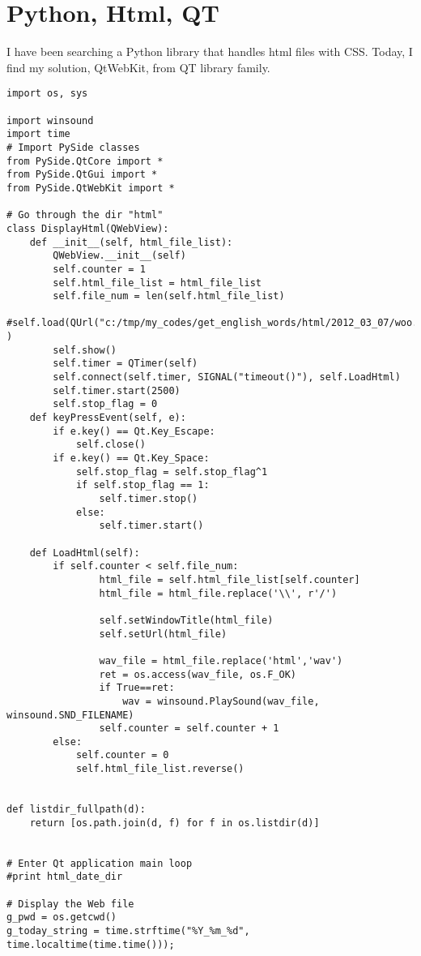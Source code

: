 \section{Python, Html, QT}
I have been searching a Python library that handles html files with CSS. Today, I find my solution, QtWebKit, from QT library family.
\begin{verbatim}
import os, sys

import winsound
import time
# Import PySide classes
from PySide.QtCore import *
from PySide.QtGui import *
from PySide.QtWebKit import *

# Go through the dir "html"
class DisplayHtml(QWebView):
    def __init__(self, html_file_list):
        QWebView.__init__(self)
        self.counter = 1
        self.html_file_list = html_file_list
        self.file_num = len(self.html_file_list)       
        #self.load(QUrl("c:/tmp/my_codes/get_english_words/html/2012_03_07/woo.html") )
        self.show()
        self.timer = QTimer(self)
        self.connect(self.timer, SIGNAL("timeout()"), self.LoadHtml)
        self.timer.start(2500)
        self.stop_flag = 0
    def keyPressEvent(self, e):
        if e.key() == Qt.Key_Escape:
            self.close()
        if e.key() == Qt.Key_Space:
            self.stop_flag = self.stop_flag^1 
            if self.stop_flag == 1:
                self.timer.stop()
            else:
                self.timer.start()

    def LoadHtml(self):
        if self.counter < self.file_num:
                html_file = self.html_file_list[self.counter]
                html_file = html_file.replace('\\', r'/')

                self.setWindowTitle(html_file)
                self.setUrl(html_file)

                wav_file = html_file.replace('html','wav')
                ret = os.access(wav_file, os.F_OK)
                if True==ret:
                    wav = winsound.PlaySound(wav_file, winsound.SND_FILENAME)
                self.counter = self.counter + 1
        else:
            self.counter = 0 
            self.html_file_list.reverse()


def listdir_fullpath(d):
    return [os.path.join(d, f) for f in os.listdir(d)]


# Enter Qt application main loop
#print html_date_dir

# Display the Web file
g_pwd = os.getcwd()
g_today_string = time.strftime("%Y_%m_%d", time.localtime(time.time())); 
        

\end{verbatim}
